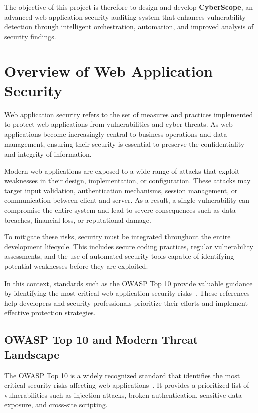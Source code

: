 \indent The objective of this project is therefore to design and develop \textbf{CyberScope}, an advanced web application security auditing system that enhances vulnerability detection through intelligent orchestration, automation, and improved analysis of security findings.

\section{Overview of Web Application Security}

\justifying
Web application security refers to the set of measures and practices implemented to protect web applications from vulnerabilities and cyber threats. As web applications become increasingly central to business operations and data management, ensuring their security is essential to preserve the confidentiality and  integrity of information.

\indent Modern web applications are exposed to a wide range of attacks that exploit weaknesses in their design, implementation, or configuration. These attacks may target input validation, authentication mechanisms, session management, or communication between client and server. As a result, a single vulnerability can compromise the entire system and lead to severe consequences such as data breaches, financial loss, or reputational damage.

\indent To mitigate these risks, security must be integrated throughout the entire development lifecycle. This includes secure coding practices, regular vulnerability assessments, and the use of automated security tools capable of identifying potential weaknesses before they are exploited.

\indent In this context, standards such as the OWASP Top 10 provide valuable guidance by identifying the most critical web application security risks~\cite{owasp}. These references help developers and security professionals prioritize their efforts and implement effective protection strategies.

\subsection{OWASP Top 10 and Modern Threat Landscape}

\indent The OWASP Top 10 is a widely recognized standard that identifies the most critical security risks affecting web applications~\cite{owasp}. It provides a prioritized list of vulnerabilities such as injection attacks, broken authentication, sensitive data exposure, and cross-site scripting.

